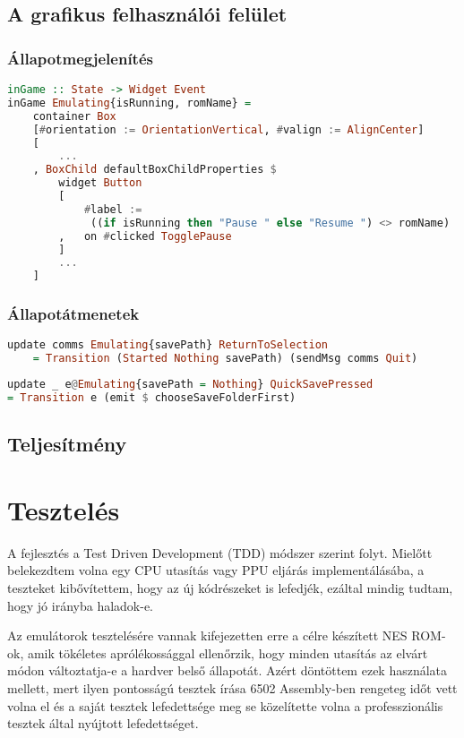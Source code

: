 \section{A grafikus felhasználói felület}

\subsection{Állapotmegjelenítés}

\begin{lstlisting}[language=Haskell]
inGame :: State -> Widget Event
inGame Emulating{isRunning, romName} = 
	container Box
	[#orientation := OrientationVertical, #valign := AlignCenter]
	[
		...
	, BoxChild defaultBoxChildProperties $ 
		widget Button
		[ 
			#label :=
			 ((if isRunning then "Pause " else "Resume ") <> romName)
		,	on #clicked TogglePause
		]
		...
	]
\end{lstlisting}

\subsection{Állapotátmenetek}

\begin{lstlisting}[language=Haskell]
update comms Emulating{savePath} ReturnToSelection 
	= Transition (Started Nothing savePath) (sendMsg comms Quit)
\end{lstlisting}


\begin{lstlisting}[language=Haskell]
update _ e@Emulating{savePath = Nothing} QuickSavePressed
= Transition e (emit $ chooseSaveFolderFirst)
\end{lstlisting}

\section{Teljesítmény}

\chapter{Tesztelés}

A fejlesztés a Test Driven Development (TDD) módszer szerint folyt. Mielőtt belekezdtem volna egy CPU utasítás vagy PPU eljárás implementálásába, a teszteket kibővítettem, hogy az új kódrészeket is lefedjék, ezáltal mindig tudtam, hogy jó irányba haladok-e.

Az emulátorok tesztelésére vannak kifejezetten erre a célre készített NES ROM-ok, amik tökéletes aprólékossággal ellenőrzik, hogy minden utasítás az elvárt módon változtatja-e a hardver belső állapotát. Azért döntöttem ezek használata mellett, mert ilyen pontosságú tesztek írása 6502 Assembly-ben rengeteg időt vett volna el és a saját tesztek lefedettsége meg se közelítette volna a professzionális tesztek által nyújtott lefedettséget. 

